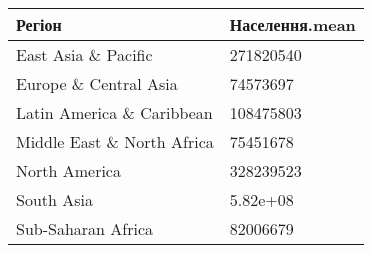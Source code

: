 \documentclass[
]{article}
\begin{document}
\begin{longtable}[]{@{}ll@{}}
\toprule
\begin{minipage}[b]{0.18\columnwidth}\raggedright
Регіон\strut
\end{minipage} & \begin{minipage}[b]{0.22\columnwidth}\raggedright
Населення.mean\strut
\end{minipage}\tabularnewline
\midrule
\endhead
\begin{minipage}[t]{0.18\columnwidth}\raggedright
East Asia \& Pacific\strut
\end{minipage} & \begin{minipage}[t]{0.22\columnwidth}\raggedright
271820540\strut
\end{minipage}\tabularnewline
\begin{minipage}[t]{0.18\columnwidth}\raggedright
Europe \& Central Asia\strut
\end{minipage} & \begin{minipage}[t]{0.22\columnwidth}\raggedright
74573697\strut
\end{minipage}\tabularnewline
\begin{minipage}[t]{0.18\columnwidth}\raggedright
Latin America \& Caribbean\strut
\end{minipage} & \begin{minipage}[t]{0.22\columnwidth}\raggedright
108475803\strut
\end{minipage}\tabularnewline
\begin{minipage}[t]{0.18\columnwidth}\raggedright
Middle East \& North Africa\strut
\end{minipage} & \begin{minipage}[t]{0.22\columnwidth}\raggedright
75451678\strut
\end{minipage}\tabularnewline
\begin{minipage}[t]{0.18\columnwidth}\raggedright
North America\strut
\end{minipage} & \begin{minipage}[t]{0.22\columnwidth}\raggedright
328239523\strut
\end{minipage}\tabularnewline
\begin{minipage}[t]{0.18\columnwidth}\raggedright
South Asia\strut
\end{minipage} & \begin{minipage}[t]{0.22\columnwidth}\raggedright
5.82e+08\strut
\end{minipage}\tabularnewline
\begin{minipage}[t]{0.18\columnwidth}\raggedright
Sub-Saharan Africa\strut
\end{minipage} & \begin{minipage}[t]{0.22\columnwidth}\raggedright
82006679\strut
\end{minipage}\tabularnewline
\bottomrule
\end{longtable}
\end{document}
